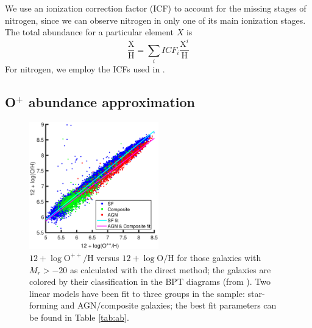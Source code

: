 We use an ionization correction factor (ICF) to account for the missing stages 
of nitrogen, since we can observe nitrogen in only one of its main ionization 
stages.  The total abundance for a particular element $X$ is 
\begin{equation}
    \frac{\text{X}}{\text{H}} = \sum_i ICF_i \frac{\text{X}^i}{\text{H}}
\end{equation}
For nitrogen, we employ the ICFs used in \cite{Douglass17b}.


\subsection{O$^+$ abundance approximation}\label{sec:Oplus_approx}

\begin{figure}
    \centering
    \includegraphics[width=0.5\textwidth]{Images/Paper3/Zlow_v_Zreal_1sig_I06_BPTclass_fits}
    \caption{$12 + \log{\text{O}^{++}/\text{H}}$ versus 
    $12 + \log{\text{O}/\text{H}}$ for those galaxies with $M_r > -20$ as 
    calculated with the direct method; the galaxies are colored by their 
    classification in the BPT diagrams (from \cite{Brinchmann04}).  Two linear 
    models have been fit to three groups in the sample: star-forming and 
    AGN/composite galaxies; the best fit parameters can be found in Table 
    \ref{tab:ab}.}
    \label{fig:lowVreal}
\end{figure}

